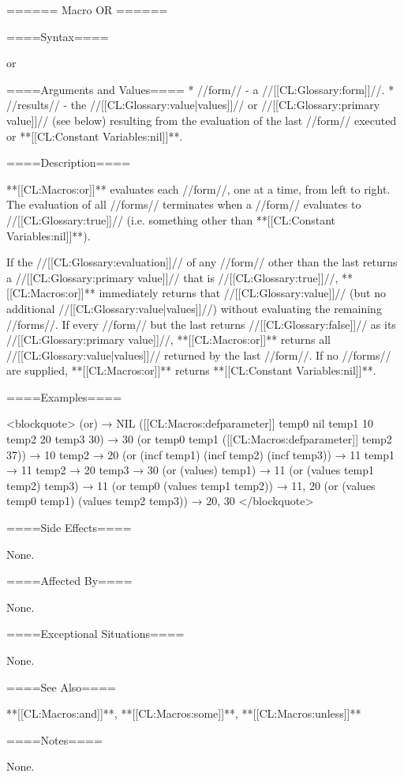 ====== Macro OR ======

====Syntax====

\DefmacWithValues or {} {}

====Arguments and Values====
  * //form// - a //[[CL:Glossary:form]]//.
  * //results// - the //[[CL:Glossary:value|values]]// or //[[CL:Glossary:primary value]]// (see below) resulting from the evaluation of the last //form// executed or **[[CL:Constant Variables:nil]]**.

====Description====

**[[CL:Macros:or]]** evaluates each //form//, one at a time, from left to right. The evaluation of all //forms// terminates when a //form// evaluates to //[[CL:Glossary:true]]// (i.e. something other than **[[CL:Constant Variables:nil]]**).

If the //[[CL:Glossary:evaluation]]// of any //form// other than the last returns a //[[CL:Glossary:primary value]]// that is //[[CL:Glossary:true]]//, **[[CL:Macros:or]]** immediately returns that //[[CL:Glossary:value]]// (but no additional //[[CL:Glossary:value|values]]//) without evaluating the remaining //forms//. If every //form// but the last returns //[[CL:Glossary:false]]// as its //[[CL:Glossary:primary value]]//, **[[CL:Macros:or]]** returns all //[[CL:Glossary:value|values]]// returned by the last //form//. If no //forms// are supplied, **[[CL:Macros:or]]** returns **[[CL:Constant Variables:nil]]**.

====Examples====

<blockquote> (or) → NIL ([[CL:Macros:defparameter]] temp0 nil temp1 10 temp2 20 temp3 30) → 30 (or temp0 temp1 ([[CL:Macros:defparameter]] temp2 37)) → 10 temp2 → 20 (or (incf temp1) (incf temp2) (incf temp3)) → 11 temp1 → 11 temp2 → 20 temp3 → 30 (or (values) temp1) → 11 (or (values temp1 temp2) temp3) → 11 (or temp0 (values temp1 temp2)) → 11, 20 (or (values temp0 temp1) (values temp2 temp3)) → 20, 30 </blockquote>

====Side Effects====

None.

====Affected By====

None.

====Exceptional Situations====

None.

====See Also====

**[[CL:Macros:and]]**, **[[CL:Macros:some]]**, **[[CL:Macros:unless]]**

====Notes====

None.

